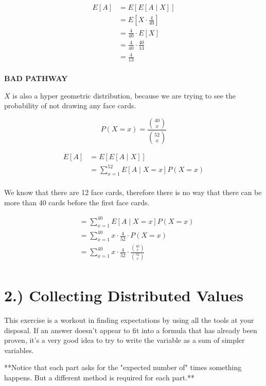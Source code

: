 \documentclass{report}
\begin{document}
\begin{align*}
E[A] &= E[E[A \mid X]] \\
&= E\left[ X \cdot \frac{4}{40} \right] \\
&= \frac{4}{40} \cdot E[X] \\
&= \frac{4}{40} \cdot \frac{40}{13} \\
&= \frac{4}{13} \\
\end{align*}

\hrulefill

\textbf{BAD PATHWAY} 

$ X $ is also a hyper geometric distribution, because we are trying to see the probability of not drawing any face cards. 

$$P(X=x) = \frac{\binom{40}{x}}{\binom{52}{x}}$$

\begin{align*}
	E[A] &= E[E[A \mid X]] \\
	&= \sum_{x=1}^{52} E[A \mid X=x] P(X=x)  \\
\end{align*}

We know that there are 12 face cards, therefore there is no way that there can be more than 40 cards before the first face cards. 


\begin{align*}
	&= \sum_{x=1}^{40} E[A \mid X=x] P(X=x) \\
	&= \sum_{x=1}^{40} x \cdot \frac{4}{52} \cdot P(X=x) \\
	&= \sum_{x=1}^{40} x \cdot \frac{4}{52} \cdot \frac{\binom{40}{x}}{\binom{52}{x}} \\
\end{align*}



\newpage

\section*{2.) Collecting Distributed Values}

This exercise is a workout in finding expectations by using all the tools at your disposal. If an answer doesn't appear to fit into a formula that has already been proven, it's a very good idea to try to write the variable as a sum of simpler variables.

**Notice that each part asks for the "expected number of" times something happens. But a different method is required for each part.**
\end{document}
